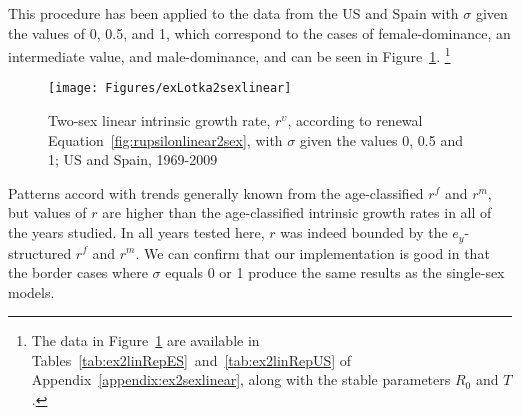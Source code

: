  \FloatBarrier
This procedure has been applied to the data from the US and Spain with $\sigma$
given the values of 0, 0.5, and 1, which correspond to the cases of
female-dominance, an intermediate value, and male-dominance, 
and can be seen in Figure~\ref{fig:rupsilonlinear2sex}. \footnote{The data in
Figure~\ref{fig:rupsilonlinear2sex} are available in Tables~\ref{tab:ex2linRepES}~and~\ref{tab:ex2linRepUS} of
    Appendix~\ref{appendix:ex2sexlinear}, along with the stable parameters
    $R_0$ and $T$.}

\begin{figure}[!ht]
  \centering
    \caption{Two-sex linear intrinsic growth rate, $r^\upsilon$, according to
    renewal Equation~\eqref{fig:rupsilonlinear2sex}, with $\sigma$ given the
    values 0, 0.5 and 1; US and Spain, 1969-2009}
     \texttt{[image: Figures/exLotka2sexlinear]}
     \label{fig:rupsilonlinear2sex}
\end{figure}

Patterns accord with trends generally known from the age-classified $r^f$ and
$r^m$, but values of $r$ are higher than the
age-classified intrinsic growth rates in all of the years studied. In all years
tested here, $r$ was indeed bounded by the $e_y$-structured $r^f$ and $r^m$.
We can confirm that our implementation is good in that the border cases
where $\sigma$ equals 0 or 1 produce the same results as the single-sex models.

\FloatBarrier
